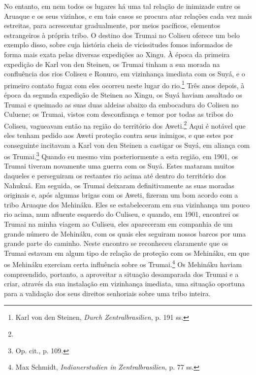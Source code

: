 No entanto, em nem todos os lugares há uma tal relação de inimizade
entre os Aruaque e os seus vizinhos, e em tais casos se procura atar
relações cada vez mais estreitas, para acrescentar gradualmente, por
meios pacíficos, elementos estrangeiros à própria tribo. O destino dos
Trumai no Coliseu oferece um belo exemplo disso, sobre cuja história
cheia de vicissitudes fomos informados de forma mais exata pelas
diversas expedições ao Xingu. À época da primeira expedição de Karl von
den Steinen, os Trumai tinham a sua morada na confluência dos rios
Coliseu e Ronuro, em vizinhança imediata com os Suyá, e o primeiro
contato fugaz com eles ocorreu neste lugar do rio.\footnote{Karl von den
  Steinen, \emph{Durch Zentralbrasilien}, p. 191 ss.} Três anos depois,
à época da segunda expedição de Steinen ao Xingu, os Suyá haviam
assaltado os Trumai e queimado as suas duas aldeias abaixo da embocadura
do Coliseu no Culuene; os Trumai, vistos com desconfiança e temor por
todas as tribos do Coliseu, vagueavam então na região do território dos
Aweti.\footnote{} Aqui é notável que
eles tenham pedido aos Aweti proteção contra seus inimigos, e que estes
por conseguinte incitavam a Karl von den Steinen a castigar os Suyá, em
aliança com os Trumai.\footnote{Op. cit., p. 109.} Quando eu mesmo vim
posteriormente a esta região, em 1901, os Trumai tiveram novamente uma
guerra com os Suyá. Estes mataram muitos daqueles e perseguiram os
restantes rio acima até dentro do território dos Nahukuá. Em seguida, os
Trumai deixaram definitivamente as suas moradas originais e, após
algumas brigas com os Aweti, fizeram um bom acordo com a tribo Aruaque
dos Mehináku. Eles se estabeleceram em sua vizinhança um pouco rio
acima, num afluente esquerdo do Culiseu, e quando, em 1901, encontrei os
Trumai na minha viagem ao Culiseu, eles apareceram em companhia de um
grande número de Mehináku, com os quais eles seguiram nossos barcos por
uma grande parte do caminho. Neste encontro se reconheceu claramente
que os Trumai estavam em algum tipo de relação de proteção com os
Mehináku, em que os Mehináku exerciam certa influência sobre os
Trumai.\footnote{Max Schmidt, \emph{Indianerstudien in Zentralbrasilien},
  p. 77 ss.} Os Mehináku haviam compreendido, portanto, a aproveitar a
situação desamparada dos Trumai e a criar, através da sua instalação em
vizinhança imediata, uma situação oportuna para a validação dos seus
direitos senhoriais sobre uma tribo inteira.

